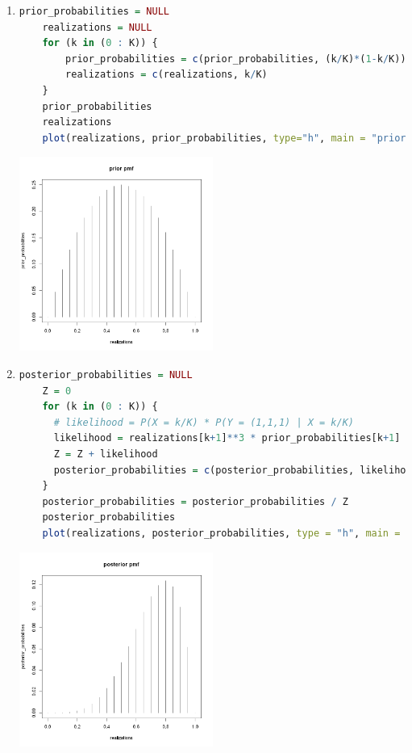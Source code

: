 \documentclass{article}
\begin{document}
\begin{enumerate}
  \item 
  \begin{lstlisting}[language=R]
    prior_probabilities = NULL
    realizations = NULL
    for (k in (0 : K)) {
        prior_probabilities = c(prior_probabilities, (k/K)*(1-k/K))
        realizations = c(realizations, k/K)
    }
    prior_probabilities
    realizations
    plot(realizations, prior_probabilities, type="h", main = "prior pmf")
  \end{lstlisting}
  \includegraphics[width=0.5\textwidth]{prior pmf.png}
  


  \item 
  \begin{lstlisting}[language=R]
    posterior_probabilities = NULL
    Z = 0
    for (k in (0 : K)) {
      # likelihood = P(X = k/K) * P(Y = (1,1,1) | X = k/K)
      likelihood = realizations[k+1]**3 * prior_probabilities[k+1]
      Z = Z + likelihood
      posterior_probabilities = c(posterior_probabilities, likelihood)
    }
    posterior_probabilities = posterior_probabilities / Z
    posterior_probabilities
    plot(realizations, posterior_probabilities, type = "h", main = "posterior pmf")
  \end{lstlisting}
  \includegraphics[width=0.5\textwidth]{posterior pmf.png}
  



\end{enumerate}
\end{document}
